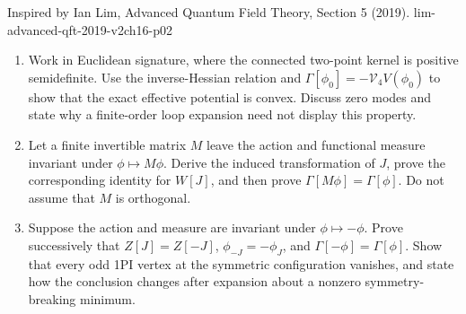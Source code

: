 \begin{enumerate}
  {Inspired by Ian Lim, Advanced Quantum Field Theory, Section 5 (2019).}
  {lim-advanced-qft-2019-v2ch16-p02}
  \begin{enumerate}
    \item[(a)]
    Work in Euclidean signature, where the connected two-point kernel is
    positive semidefinite.  Use the inverse-Hessian relation and
    \(\Gamma[\phi_0]=-\mathcal V_4V(\phi_0)\) to show that the exact
    effective potential is convex.  Discuss zero modes and state why a
    finite-order loop expansion need not display this property.
    \item[(b)]
    Let a finite invertible matrix \(M\) leave the action and functional
    measure invariant under \(\phi\mapsto M\phi\).  Derive the induced
    transformation of \(J\), prove the corresponding identity for \(W[J]\),
    and then prove \(\Gamma[M\phi]=\Gamma[\phi]\).  Do not assume that \(M\)
    is orthogonal.
    \item[(c)]
    Suppose the action and measure are invariant under
    \(\phi\mapsto-\phi\).  Prove successively that \(Z[J]=Z[-J]\),
    \(\phi_{-J}=-\phi_J\), and \(\Gamma[-\phi]=\Gamma[\phi]\).
    Show that every odd 1PI vertex at the symmetric configuration vanishes,
    and state how the conclusion changes after expansion about a nonzero
    symmetry-breaking minimum.
  \end{enumerate}


\end{enumerate}
